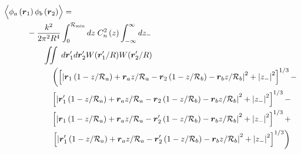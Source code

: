 \begin{equation}\label{prphase_n4}
\begin{aligned}
& \left\langle \vphantom{\hat{\phi}_{a}} \phi_{a}\left(\boldsymbol{r}_{1}\right) \phi_{b}\left(\boldsymbol{r}_{2}\right)\right\rangle = \\
&\quad\quad\quad
-\frac{k^{2}}{2\pi^{2}R^{4}} \int_{0}^{\mathcal{R}_{\rm min}} dz\;C_{n}^{2}\left(z\right)
\int_{-\infty}^{\infty} dz_{-}\\
&\quad\quad\quad\quad\quad 
\iint \; d\boldsymbol{r}^{\prime}_{1}d\boldsymbol{r}^{\prime}_{2}  
W(\boldsymbol{r}^{\prime}_{1}/R) W(\boldsymbol{r}^{\prime}_{2}/R) \\
&\quad\quad\quad\quad\quad\quad
\left(
\left[ \left\vert \boldsymbol{r}_{1}\left(1-z/\mathcal{R}_{a}\right) + \boldsymbol{r}_{a} z/\mathcal{R}_{a} - 
\boldsymbol{r}_{2}\left(1-z/\mathcal{R}_{b}\right) - \boldsymbol{r}_{b} z/\mathcal{R}_{b}\right\vert^{2} + 
\left\vert z_{-} \right\vert^{2}\right]^{1/3} -
\right. \\
& \quad\quad\quad\quad\quad\quad
\left[ \left\vert \boldsymbol{r}^{\prime}_{1}\left(1-z/\mathcal{R}_{a}\right) + \boldsymbol{r}_{a} z/\mathcal{R}_{a} - 
\boldsymbol{r}_{2}\left(1-z/\mathcal{R}_{b}\right) - \boldsymbol{r}_{b} z/\mathcal{R}_{b}\right\vert^{2} + 
\left\vert z_{-} \right\vert^{2}\right]^{1/3} - \\
& \quad\quad\quad\quad\quad\quad
\left[ \left\vert \boldsymbol{r}_{1}\left(1-z/\mathcal{R}_{a}\right) + \boldsymbol{r}_{a} z/\mathcal{R}_{a} - 
\boldsymbol{r}^{\prime}_{2}\left(1-z/\mathcal{R}_{b}\right) - \boldsymbol{r}_{b} z/\mathcal{R}_{b}\right\vert^{2} + 
\left\vert z_{-} \right\vert^{2}\right]^{1/3} + \\
& \quad\quad\quad\quad\quad\quad
\left.
\left[ \left\vert \boldsymbol{r}^{\prime}_{1}\left(1-z/\mathcal{R}_{a}\right) + \boldsymbol{r}_{a} z/\mathcal{R}_{a} - 
\boldsymbol{r}^{\prime}_{2}\left(1-z/\mathcal{R}_{b}\right) - \boldsymbol{r}_{b} z/\mathcal{R}_{b}\right\vert^{2} + 
\left\vert z_{-} \right\vert^{2}\right]^{1/3}\right)
\end{aligned}
\end{equation}

